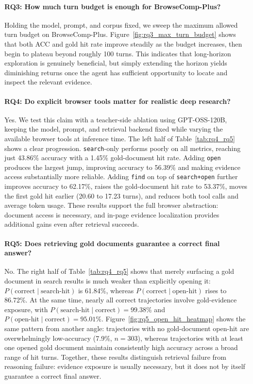
\paragraph{RQ3: How much turn budget is enough for BrowseComp-Plus?} \label{subsec:ablation_rq3}
Holding the model, prompt, and corpus fixed, we sweep the maximum allowed turn budget on BrowseComp-Plus. Figure~\ref{fig:rq3_max_turn_budget} shows that both ACC and gold hit rate improve steadily as the budget increases, then begin to plateau beyond roughly 100 turns. This indicates that long-horizon exploration is genuinely beneficial, but simply extending the horizon yields diminishing returns once the agent has sufficient opportunity to locate and inspect the relevant evidence.



\paragraph{RQ4: Do explicit browser tools matter for realistic deep research?} \label{subsec:ablation_rq4}
Yes. We test this claim with a teacher-side ablation using GPT-OSS-120B, keeping the model, prompt, and retrieval backend fixed while varying the available browser tools at inference time. The left half of Table~\ref{tab:rq4_rq5} shows a clear progression. \texttt{search}-only performs poorly on all metrics, reaching just 43.86\% accuracy with a 1.45\% gold-document hit rate. Adding \texttt{open} produces the largest jump, improving accuracy to 56.39\% and making evidence access substantially more reliable. Adding \texttt{find} on top of \texttt{search+open} further improves accuracy to 62.17\%, raises the gold-document hit rate to 53.37\%, moves the first gold hit earlier (20.60 to 17.23 turns), and reduces both tool calls and average token usage. These results support the full browser abstraction: document access is necessary, and in-page evidence localization provides additional gains even after retrieval succeeds.

\paragraph{RQ5: Does retrieving gold documents guarantee a correct final answer?} \label{subsec:ablation_rq5}
No. The right half of Table~\ref{tab:rq4_rq5} shows that merely surfacing a gold document in search results is much weaker than explicitly opening it: $P(\text{correct}\mid\text{search-hit})$ is 61.84\%, whereas $P(\text{correct}\mid\text{open-hit})$ rises to 86.72\%. At the same time, nearly all correct trajectories involve gold-evidence exposure, with $P(\text{search-hit}\mid\text{correct})=99.38\%$ and $P(\text{open-hit}\mid\text{correct})=95.01\%$. Figure~\ref{fig:rq5_open_hit_heatmap} shows the same pattern from another angle: trajectories with no gold-document open-hit are overwhelmingly low-accuracy (7.9\%, $n=303$), whereas trajectories with at least one opened gold document maintain consistently high accuracy across a broad range of hit turns. Together, these results distinguish retrieval failure from reasoning failure: evidence exposure is usually necessary, but it does not by itself guarantee a correct final answer.


